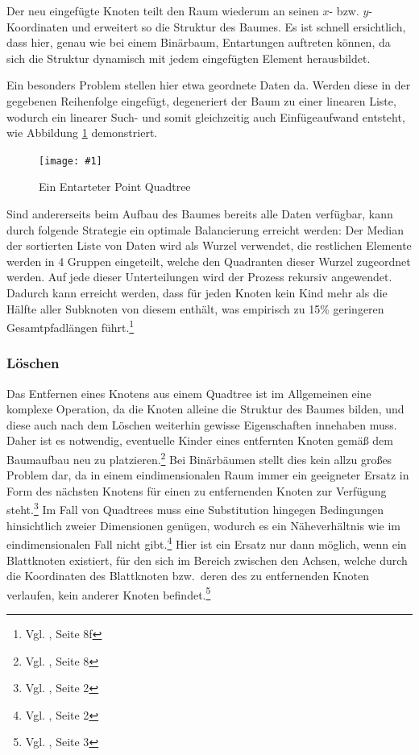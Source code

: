 \documentclass[%
			paper=a4,%
			DIV12,
			liststotoc,
			bibtotoc,
			draft=false,%
			titlepage,
			numbers=noendperiod
			]{scrartcl}
\newcommand{\zit}[3]{#1 \cite{#2}, #3}
\newcommand{\footzit}[3]{\footnote{\zit{#1}{#2}{#3}}}
\newcommand{\myfig}[5] {
 \begin{figure}[tbph]
	 \centering
	 \texttt{[image: \#1]}
	 \caption[#4]{#5}
	 \label{fig:#2}
 \end{figure}
}
\begin{document}
Der neu eingefügte Knoten teilt den Raum wiederum an seinen $x$- bzw. $y$-Koordinaten und erweitert so die Struktur des Baumes.  
Es ist schnell ersichtlich, dass hier, genau wie bei einem Binärbaum, Entartungen auftreten können, da sich die Struktur dynamisch mit jedem eingefügten Element herausbildet.

Ein besonders Problem stellen hier etwa geordnete Daten da. Werden diese in der gegebenen Reihenfolge eingefügt, degeneriert der Baum zu einer linearen Liste, wodurch ein linearer Such- und somit gleichzeitig auch Einfügeaufwand entsteht, wie Abbildung \ref{fig:entartung} demonstriert.
\myfig{img/pointquadtree-entartet-trimmed}{entartung}{width=.6\textwidth}{Entarteter Point Quadtree}{Ein Entarteter Point Quadtree}

Sind andererseits beim Aufbau des Baumes bereits alle Daten verfügbar, kann durch folgende Strategie ein optimale Balancierung erreicht werden: Der Median der sortierten Liste von Daten wird als Wurzel verwendet, die restlichen Elemente werden in 4 Gruppen eingeteilt, welche den Quadranten dieser Wurzel zugeordnet werden.
Auf jede dieser Unterteilungen wird der Prozess rekursiv angewendet. Dadurch kann erreicht werden, dass für jeden Knoten kein Kind mehr als die Hälfte aller Subknoten von diesem enthält, was empirisch zu 15\% geringeren Gesamtpfadlängen führt.\footzit{Vgl.}{DBLP:journals/acta/FinkelB74}{Seite 8f}


\subsubsection{Löschen}
\label{sec:pointquadtree:delete}
Das Entfernen eines Knotens aus einem Quadtree ist im Allgemeinen eine komplexe Operation, da die Knoten alleine die Struktur des Baumes bilden, und diese auch nach dem Löschen weiterhin gewisse Eigenschaften innehaben muss.
Daher ist es notwendig, eventuelle Kinder eines entfernten Knoten gemäß dem Baumaufbau neu zu platzieren.\footzit{Vgl.}{DBLP:journals/acta/FinkelB74}{Seite 8}
Bei Binärbäumen stellt dies kein allzu großes Problem dar, da in einem eindimensionalen Raum immer ein geeigneter Ersatz in Form des nächsten Knotens für einen zu entfernenden Knoten zur Verfügung steht.\footzit{Vgl.}{DBLP:journals/cacm/Samet80a}{Seite 2}
Im Fall von Quadtrees muss eine Substitution hingegen Bedingungen hinsichtlich zweier Dimensionen genügen, wodurch es ein Näheverhältnis wie im eindimensionalen Fall nicht gibt.\footzit{Vgl.}{DBLP:journals/cacm/Samet80a}{Seite 2}
Hier ist ein Ersatz nur dann möglich, wenn ein Blattknoten existiert, für den sich im Bereich zwischen den Achsen, welche durch die Koordinaten des Blattknoten bzw.\ deren des zu entfernenden Knoten verlaufen, kein anderer Knoten befindet.\footzit{Vgl.}{DBLP:journals/cacm/Samet80a}{Seite 3}
\end{document}
